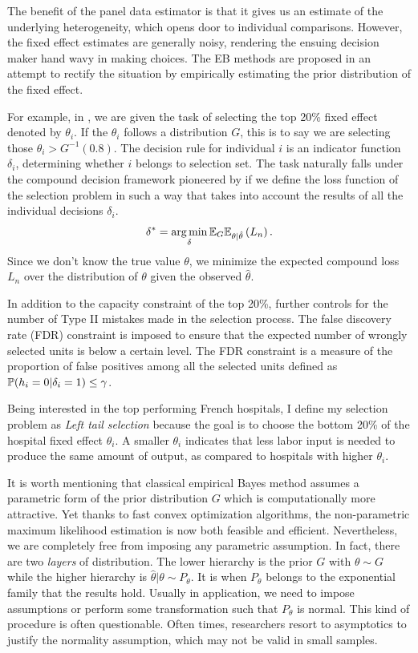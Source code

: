 \documentclass[12pt]{article}
\begin{document}
The benefit of the panel data estimator is that it gives us an estimate of the
underlying heterogeneity, which opens door to individual comparisons. However,
the fixed effect estimates are generally noisy, rendering the ensuing decision
maker hand wavy in making choices. The EB methods are proposed in an attempt to
rectify the situation by empirically estimating the prior distribution of the
fixed effect.

For example, in \cite{gu2023invidious}, we are given the task of selecting the
top 20\% fixed effect denoted by $\theta_i$. If the $\theta_i$ follows a
distribution $G$, this is to say we are selecting those $\theta_i>G^{-1}(0.8)$.
The decision rule for individual $i$ is an indicator function $\delta_i$,
determining whether $i$ belongs to selection set. The task naturally falls
under the compound decision framework pioneered by \cite{herbert1956empirical}
if we define the loss function of the selection problem in such a way that
takes into account the results of all the individual decisions $\delta_i$.
\begin{equation*}
    \delta^* = \operatorname*{arg\,min}_{\delta} \mathbb{E}_G\mathbb{E}_{\theta|\hat{\theta}}\left(L_n\right).
\end{equation*}
Since we don't know the true value $\theta$, we minimize the expected compound loss  $L_n$ over the distribution of $\theta$ given the observed $\hat{\theta}$.

In addition to the capacity constraint of the top 20\%, \citet{gu2023invidious}
further controls for the number of Type II mistakes made in the selection
process. The false discovery rate (FDR) constraint is imposed to ensure that
the expected number of wrongly selected units is below a certain level. The FDR
constraint is a measure of the proportion of false positives among all the
selected units defined as $\mathbb{P}(h_i=0|\delta_i=1)\le \gamma$.

Being interested in the top performing French hospitals, I define my selection
problem as \textit{Left tail selection} because the goal is to choose the
bottom 20\% of the hospital fixed effect $\theta_i$. A smaller $\theta_i$
indicates that less labor input is needed to produce the same amount of output,
as compared to hospitals with higher $\theta_i$.

It is worth mentioning that classical empirical Bayes method assumes a
parametric form of the prior distribution $G$ which is computationally more
attractive. Yet thanks to fast convex optimization algorithms, the
non-parametric maximum likelihood estimation is now both feasible and
efficient. Nevertheless, we are completely free from imposing any parametric
assumption. In fact, there are two \textit{layers} of distribution. The lower
hierarchy is the prior $G$ with $\theta\sim G$ while the higher hierarchy is
$\hat{\theta}|\theta \sim P_{\theta}$. It is when $P_{\theta}$ belongs to the
exponential family that the \citet{lindsay1995mixture} results hold. Usually in
application, we need to impose assumptions or perform some transformation such
that $P_{\theta}$ is normal. This kind of procedure is often questionable.
Often times, researchers resort to asymptotics to justify the normality
assumption, which may not be valid in small samples.
\end{document}

